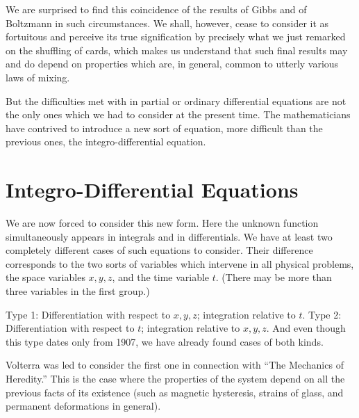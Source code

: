\documentclass[12pt,oneside]{book}
\begin{document}
We are surprised to find this coincidence of the results of Gibbs and of
Boltzmann in such circumstances. We shall, however, cease to consider it as
fortuitous and perceive its true signification by precisely what we just
remarked on the shuffling of cards, which makes us understand that such final
results may and do depend on properties which are, in general, common to utterly
various laws of mixing. \par

But the difficulties met with in partial or ordinary differential equations are
not the only ones which we had to consider at the present time. The
mathematicians have contrived to introduce a new sort of equation, more difficult
than the previous ones, the integro-differential equation. \par

\section{Integro-Differential Equations}

We are now forced to consider this new form. Here the unknown function
simultaneously appears in integrals and in differentials. We have at least two
completely different cases of such equations to consider. Their difference
corresponds to the two sorts of variables which intervene in all physical
problems, the space variables $x,y,z$, and the time variable $t$. (There may be
more than three variables in the first group.) \par

Type 1: Differentiation with respect to $x,y,z$; integration relative to $t$.
Type 2: Differentiation with respect to $t$; integration relative to $x,y,z$.
And even though this type dates only from 1907, we have already found cases of
both kinds. \par

Volterra was led to consider the first one in connection with ``The Mechanics of
Heredity.'' This is the case where the properties of the system depend on all
the previous facts of its existence (such as magnetic hysteresis, strains of
glass, and permanent deformations in general). \par
\end{document}
